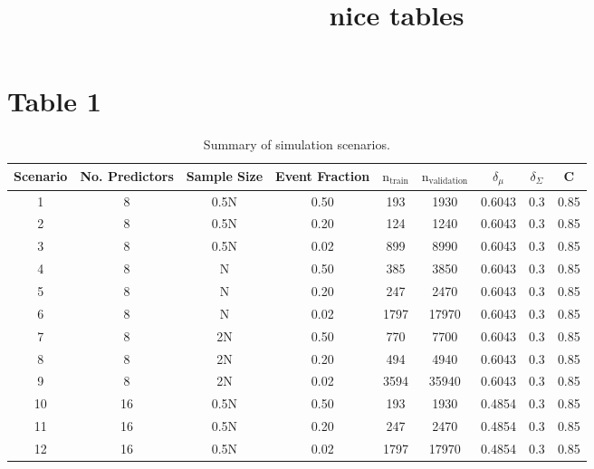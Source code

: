 \documentclass[
]{article}
\title{nice tables}
\author{}
\date{\vspace{-2.5em}}
\begin{document}
\maketitle

\hypertarget{table-1}{%
\section{Table 1}\label{table-1}}

\begin{table}[!h]

\caption{\label{tab:tab:table}Summary of simulation scenarios.}
\centering
\begin{tabular}[t]{ccccccccc}
\toprule
Scenario & No. Predictors & Sample Size & Event Fraction & $\mathrm{n}_{\mathrm{train}}$ & $\mathrm{n}_{\mathrm{validation}}$ & $\delta_\mu$ & $\delta_\Sigma$ & C\\
\midrule
1 & 8 & 0.5N & 0.50 & 193 & 1930 & 0.6043 & 0.3 & 0.85\\
  
2 & 8 & 0.5N & 0.20 & 124 & 1240 & 0.6043 & 0.3 & 0.85\\
  
3 & 8 & 0.5N & 0.02 & 899 & 8990 & 0.6043 & 0.3 & 0.85\\
  
4 & 8 & N & 0.50 & 385 & 3850 & 0.6043 & 0.3 & 0.85\\
  
5 & 8 & N & 0.20 & 247 & 2470 & 0.6043 & 0.3 & 0.85\\
  
6 & 8 & N & 0.02 & 1797 & 17970 & 0.6043 & 0.3 & 0.85\\
  
7 & 8 & 2N & 0.50 & 770 & 7700 & 0.6043 & 0.3 & 0.85\\
  
8 & 8 & 2N & 0.20 & 494 & 4940 & 0.6043 & 0.3 & 0.85\\
  
9 & 8 & 2N & 0.02 & 3594 & 35940 & 0.6043 & 0.3 & 0.85\\
  
10 & 16 & 0.5N & 0.50 & 193 & 1930 & 0.4854 & 0.3 & 0.85\\
  
11 & 16 & 0.5N & 0.20 & 247 & 2470 & 0.4854 & 0.3 & 0.85\\
  
12 & 16 & 0.5N & 0.02 & 1797 & 17970 & 0.4854 & 0.3 & 0.85\\
  

\end{tabular}
\end{table}
\end{document}
